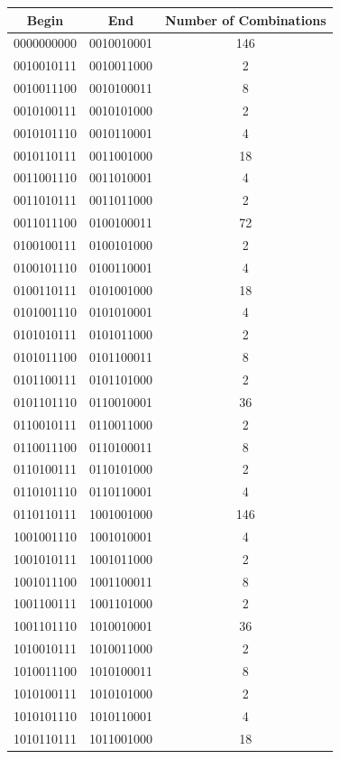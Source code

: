 \documentclass{article}
\begin{document}
	\begin{center}
	\begin{tabular}{|c|c|c|}
	\hline
	Begin & End & Number of Combinations\\
	\hline
	0000000000&0010010001&146 \\
	\hline
	0010010111&0010011000&2 \\
	\hline
	0010011100&0010100011&8\\
	\hline
	0010100111&0010101000&2\\
	\hline
	0010101110&0010110001&4\\
	\hline
	0010110111&0011001000&18\\
	\hline
	0011001110&0011010001&4\\
	\hline
	0011010111&0011011000&2\\
	\hline
	0011011100&0100100011&72\\
	\hline
	0100100111&0100101000&2\\
	\hline
	0100101110&0100110001&4\\
	\hline
	0100110111&0101001000&18\\
	\hline
	0101001110&0101010001&4\\
	\hline
	0101010111&0101011000&2\\
	\hline
	0101011100&0101100011&8\\
	\hline
	0101100111&0101101000&2\\
	\hline
	0101101110&0110010001&36\\
	\hline
	0110010111&0110011000&2\\
	\hline
	0110011100&0110100011&8\\
	\hline
	0110100111&0110101000&2\\
	\hline
	0110101110&0110110001&4\\
	\hline
	0110110111&1001001000&146\\
	\hline
	1001001110&1001010001&4\\
	\hline
	1001010111&1001011000&2\\
	\hline
	1001011100&1001100011&8\\
	\hline
	1001100111&1001101000&2\\
	\hline
	1001101110&1010010001&36\\
	\hline
	1010010111&1010011000&2\\
	\hline
	1010011100&1010100011&8\\
	\hline
	1010100111&1010101000&2\\
	\hline
	1010101110&1010110001&4\\
	\hline
	1010110111&1011001000&18\\

\end{tabular}
\end{center}
\end{document}
